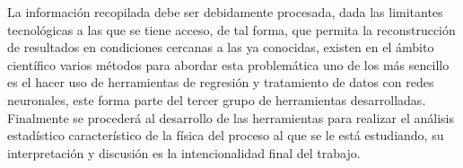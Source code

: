 


La información recopilada debe ser debidamente procesada, dada las limitantes tecnológicas a las que se tiene acceso, de tal forma, que permita la reconstrucción de resultados en condiciones cercanas a las ya conocidas, existen en el ámbito científico varios métodos para abordar esta problemática uno de los más sencillo es el hacer uso de herramientas de regresión y tratamiento de datos con redes neuronales, este forma parte del tercer grupo de herramientas desarrolladas. Finalmente se procederá al desarrollo de las herramientas para realizar el análisis estadístico característico de la física del proceso al que se le está estudiando, su interpretación y discusión es la intencionalidad final del trabajo. 





